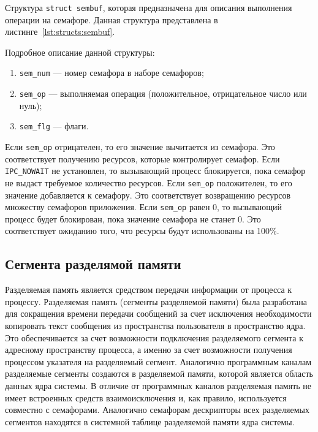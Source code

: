 Структура \texttt{struct sembuf}, которая предназначена для описания выполнения операции на семафоре.
Данная структура представлена в листинге~\ref{lst:structs:sembuf}.



Подробное описание данной структуры:
\begin{enumerate}
	\item \texttt{sem\_num} ---  номер семафора в наборе семафоров;
	\item \texttt{sem\_op} --- выполняемая операция (положительное, отрицательное число или нуль);
	\item \texttt{sem\_flg} --- флаги.
\end{enumerate}

Если \texttt{sem\_op} отрицателен, то его значение вычитается из семафора. Это соответствует получению ресурсов, которые контролирует семафор. Если \texttt{IPC\_NOWAIT} не установлен, то вызывающий процесс блокируется, пока семафор не выдаст требуемое количество ресурсов. Если \texttt{sem\_op} положителен, то его значение добавляется к семафору. Это соответствует возвращению ресурсов множеству семафоров приложения. Если \texttt{sem\_op} равен 0, то вызывающий процесс будет блокирован, пока значение семафора не станет 0. Это соответствует ожиданию того, что ресурсы будут использованы на 100\%.

\subsection{Сегмента разделямой памяти}

Разделяемая память является средством передачи информации от процесса к
процессу. 
Разделяемая память (сегменты разделяемой памяти) была разработана для сокращения времени передачи сообщений за счет исключения необходимости копировать текст сообщения из пространства пользователя в пространство ядра. Это обеспечивается за счет возможности подключения разделяемого сегмента к адресному пространству процесса, а именно за счет возможности получения процессом указателя на разделяемый сегмент.
Аналогично программным каналам разделяемые сегменты создаются в разделяемой памяти, которой является область данных ядра системы. В отличие от программных каналов разделяемая память не имеет встроенных средств взаимоисключения и, как правило, используется совместно с семафорами.
Аналогично семафорам дескрипторы всех разделяемых сегментов находятся в системной таблице разделяемой памяти ядра системы.

